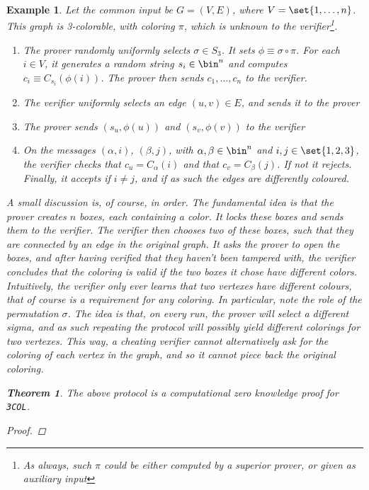 \documentclass{article}
\newtheorem{theorem}{Theorem}
\newtheorem{example}{Example}
\begin{document}
\begin{example}
    Let the common input be $G = (V, E)$, where $V = \set{1, \dots, n }$.
    This graph is 3-colorable, with coloring $\pi$, which is unknown to the verifier\footnote{As always, such $\pi$ could be either computed by a superior prover, or given as auxiliary input}.
    \begin{enumerate}
        \item The prover randomly uniformly selects $\sigma \in S_3$. It sets $\phi \equiv \sigma \circ \pi$.
              For each $i \in V$, it generates a random string $s_i \in \bin^n$ and computes $c_i \equiv C_{s_i}(\phi(i))$.
              The prover then sends $c_1, \dots, c_n$ to the verifier.
        \item The verifier uniformly selects an edge $(u, v) \in E$, and sends it to the prover
        \item The prover sends $(s_u, \phi(u))$ and $(s_v, \phi(v))$ to the verifier
        \item On the messages $(\alpha, i)$, $(\beta, j)$, with $\alpha, \beta \in \bin^n$ and $i, j \in  \set{1, 2, 3}$, the verifier checks that $c_u = C_\alpha(i)$ and that
              $c_v = C_\beta(j)$. If not it rejects. Finally, it accepts if $i \neq j$, and if as such the edges are differently coloured.
    \end{enumerate}
    A small discussion is, of course, in order. The fundamental idea is that the prover creates $n$ boxes, each containing a color.
    It locks these boxes and sends them to the verifier. The verifier then chooses two of these boxes, such that they are connected by an edge in the original graph.
    It asks the prover to open the boxes, and after having verified that they haven't been tampered with, the verifier concludes that the coloring is valid if the two boxes it chose have different colors.
    Intuitively, the verifier only ever learns that two vertexes have different colours, that of course is a requirement for any coloring.
    In particular, note the role of the permutation $\sigma$. The idea is that, on every run, the prover will select a different sigma, and as such
    repeating the protocol will possibly yield different colorings for two vertexes. This way, a cheating verifier cannot alternatively ask for the coloring
    of each vertex in the graph, and so it cannot piece back the original coloring.
    \begin{theorem}
        The above protocol is a computational zero knowledge proof for \texttt{3COL}.
    \end{theorem}
    \begin{proof}

\end{proof}
\end{example}
\end{document}
